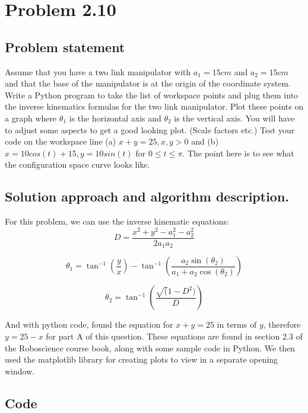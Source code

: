 \documentclass[letterpaper,11pt]{texMemo} %
\begin{document}
\maketitle %


\section*{Problem 2.10}
\subsection*{Problem statement}
Assume that you have a two link manipulator with $a_1=15cm$ and $a_2=15cm$ and that the base of the manipulator is at
the origin of the coordinate system. Write a Python program to take the list of workspace points and plug them into the
inverse kinematics formulas for the two link manipulator. Plot these points on a graph where $\theta_1$ is the horizontal
axis and $\theta_2$ is the vertical axis. You will have to adjust some aspects to get a good looking plot.
(Scale factors etc.) Test your code on the workspace line (a) $x+y=25, x,y>0$ and (b) $x=10cos(t)+15, y=10sin(t)$ for $0 \leq t \leq\pi$.
The point here is to see what the configuration space curve looks like.

\subsection*{Solution approach and algorithm description.}
For this problem, we can use the inverse kinematic equations: 
\[
    D = \frac{x^2+y^2-a^2_1-a^2_2}{2a_1 a_2}
\]

\[
    \theta_1 = \tan^{-1}(\frac{y}{x})-\tan^{-1}(\frac{a_2 \sin(\theta_2)}{a_1+a_2 \cos(\theta_2)})
\]

\[
    \theta_2 = \tan^{-1}(\frac{\sqrt(1-D^2)}{D})
\]

And with python code, found the equation for $x+y=25$ in terms of $y$, therefore $y=25-x$ for part A of this question.
These equations are found in section 2.3 of the Roboscience course book, along with some sample code in Python.
We then used the matplotlib library for creating plots to view in a separate opening window.

\newpage
\subsection*{Code}
\begin{tiny}

\end{tiny}
\end{document}
